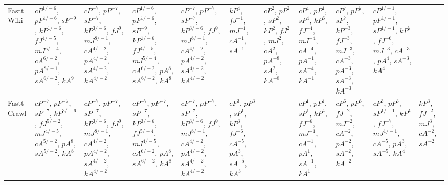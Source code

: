 \documentclass[letterpaper]{article} %
\begin{document}
\begin{sidewaystable*}
\begin{tabular}{l l l l l l l l l l l }
\multirow{10}{1.7cm}{Fastt Wiki} & \multirow{10}{1.7cm}{$cP^{1/-6}$, $pP^{1/-6}$, $sP^{-9}$, $kP^{1/-6}$, $fJ^{4/-5}$, $mJ^{5/-4}$, $cA^{6/-2}$, $pA^{8/-1}$, $sA^{6/-2}$, $kA^{9}$} & \multirow{10}{1.7cm}{$cP^{-7}$, $pP^{-7}$, $sP^{-7}$, $kP^{3/-6}$, $fJ^{9}$, $mJ^{8/-1}$, $cA^{4/-2}$, $pA^{4/-2}$, $sA^{4/-2}$, $kA^{4/-2}$} & \multirow{10}{1.7cm}{$cP^{1/-6}$, $pP^{1/-6}$, $sP^{-9}$, $kP^{1/-6}$, $fJ^{4/-5}$, $mJ^{5/-4}$, $cA^{6/-2}$, $pA^{8}$, $sA^{6/-2}$, $kA^{8}$} & \multirow{10}{1.7cm}{$cP^{-7}$, $pP^{-7}$, $sP^{-7}$, $kP^{3/-6}$, $fJ^{9}$, $mJ^{8/-1}$, $cA^{4/-2}$, $pA^{4/-2}$, $sA^{4/-2}$, $kA^{4/-2}$} & \multirow{10}{1.7cm}{$kP^{4}$, $fJ^{-1}$, $mJ^{-1}$, $cA^{-1}$, $sA^{-1}$} & \multirow{10}{1.7cm}{$cP^{2}$, $pP^{2}$, $sP^{2}$, $kP^{2}$, $fJ^{2}$, $mJ^{2}$, $cA^{2}$, $pA^{-8}$, $sA^{2}$, $kA^{-8}$} & \multirow{10}{1.7cm}{$cP^{4}$, $pP^{4}$, $sP^{4}$, $kP^{6}$, $fJ^{-4}$, $mJ^{-4}$, $cA^{-4}$, $pA^{-1}$, $sA^{-4}$, $kA^{-1}$} & \multirow{10}{1.7cm}{$cP^{7}$, $pP^{7}$, $sP^{7}$, $kP^{-3}$, $fJ^{-3}$, $mJ^{-3}$, $cA^{-3}$, $pA^{-3}$, $sA^{-3}$, $kA^{-3}$} & \multirow{10}{1.7cm}{$cP^{1/-1}$, $pP^{1/-1}$, $sP^{1/-1}$, $kP^{7}$, $fJ^{-6}$, $mJ^{-3}$, $cA^{-3}$, $pA^{4}$, $sA^{-3}$, $kA^{4}$} & \multirow{10}{1.7cm}{} \\ \\ \\ \\ \\ \\ \\ \\ \\ \\
\midrule
\multirow{10}{1.7cm}{Fastt Crawl} & \multirow{10}{1.7cm}{$cP^{-7}$, $pP^{-7}$, $sP^{-7}$, $kP^{3/-6}$, $fJ^{5/-2}$, $mJ^{4/-5}$, $cA^{5/-2}$, $pA^{8}$, $sA^{5/-2}$, $kA^{8}$} & \multirow{10}{1.7cm}{$cP^{-7}$, $pP^{-7}$, $sP^{-7}$, $kP^{3/-6}$, $fJ^{9}$, $mJ^{8/-1}$, $cA^{4/-2}$, $pA^{4/-2}$, $sA^{4/-2}$, $kA^{4/-2}$} & \multirow{10}{1.7cm}{$cP^{-7}$, $pP^{-7}$, $sP^{-7}$, $kP^{3/-6}$, $fJ^{5/-4}$, $mJ^{4/-5}$, $cA^{6/-2}$, $pA^{8}$, $sA^{6/-2}$, $kA^{8}$} & \multirow{10}{1.7cm}{$cP^{-7}$, $pP^{-7}$, $sP^{-7}$, $kP^{3/-6}$, $fJ^{9}$, $mJ^{8/-1}$, $cA^{4/-2}$, $pA^{4/-2}$, $sA^{4/-2}$, $kA^{4/-2}$} & \multirow{10}{1.7cm}{$cP^{3}$, $pP^{3}$, $sP^{1}$, $kP^{3}$, $fJ^{-6}$, $cA^{-5}$, $pA^{3}$, $sA^{-5}$, $kA^{3}$} & \multirow{10}{1.7cm}{} & \multirow{10}{1.7cm}{$cP^{1}$, $pP^{1}$, $sP^{1}$, $kP^{4}$, $fJ^{-6}$, $mJ^{-1}$, $cA^{-1}$, $pA^{1}$, $sA^{-1}$, $kA^{1}$} & \multirow{10}{1.7cm}{$cP^{6}$, $pP^{6}$, $fJ^{-2}$, $mJ^{-2}$, $cA^{-2}$, $pA^{-2}$, $sA^{-2}$, $kA^{-2}$} & \multirow{10}{1.7cm}{$cP^{3}$, $pP^{3}$, $sP^{1/-1}$, $kP^{4}$, $fJ^{-7}$, $mJ^{1/-1}$, $cA^{-5}$, $pA^{3}$, $sA^{-5}$, $kA^{4}$} & \multirow{10}{1.7cm}{$kP^{3}$, $fJ^{-2}$, $mJ^{3}$, $cA^{-2}$, $sA^{-2}$} \\ \\ \\ \\ \\ \\ \\ \\ \\ \\

\end{tabular}
\end{sidewaystable*}
\end{document}
